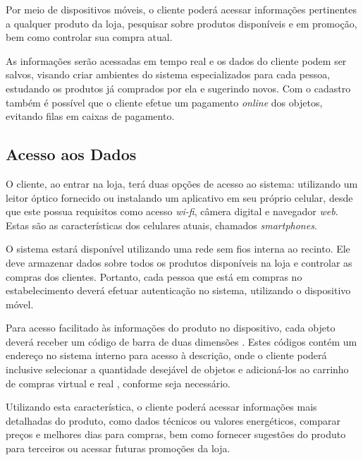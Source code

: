 \documentclass{article}
\begin{document}

Por meio de dispositivos móveis, o cliente poderá acessar informações
pertinentes a qualquer produto da loja, pesquisar sobre produtos disponíveis e
em promoção, bem como controlar sua compra atual.

As informações serão acessadas em tempo real e os dados do cliente podem ser
salvos, visando criar ambientes do sistema especializados para cada pessoa,
estudando os produtos já comprados por ela e sugerindo novos. Com o cadastro
também é possível que o cliente efetue um pagamento \emph{online} dos objetos,
evitando filas em caixas de pagamento.

\subsection{Acesso aos Dados}


O cliente, ao entrar na loja, terá duas opções de acesso ao sistema: utilizando
um leitor óptico fornecido ou instalando um aplicativo em seu próprio celular,
desde que este possua requisitos como acesso \emph{wi-fi}, câmera digital e
navegador \emph{web}. Estas são as características dos celulares atuais,
chamados \emph{smartphones}.


O sistema estará disponível utilizando uma rede sem fios interna ao recinto. Ele
deve armazenar dados sobre todos os produtos disponíveis na loja e controlar as
compras dos clientes. Portanto, cada pessoa que está em compras no
estabelecimento deverá efetuar autenticação no sistema, utilizando o dispositivo
móvel.


Para acesso facilitado às informações do produto no dispositivo, cada objeto
deverá receber um código de barra de duas dimensões \cite{alapetite2010}. Estes
códigos contém um endereço no sistema interno para acesso à descrição, onde o
cliente poderá inclusive selecionar a quantidade desejável de objetos e
adicioná-los ao carrinho de compras virtual e real \cite{dix2000}, conforme seja
necessário.


Utilizando esta característica, o cliente poderá acessar informações mais
detalhadas do produto, como dados técnicos ou valores energéticos, comparar
preços e melhores dias para compras, bem como fornecer sugestões do produto para
terceiros \cite{canny2006} ou acessar futuras promoções da loja.
\end{document}
